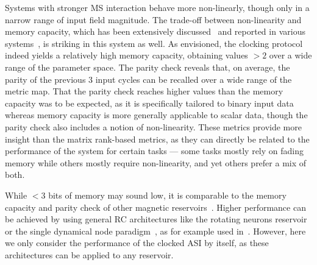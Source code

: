 Systems with stronger MS interaction behave more non-linearly, though only in a narrow range of input field magnitude.
The trade-off between non-linearity and memory capacity, which has been extensively discussed~\cite{dambre2012information,MemoryNonlinearityReservoirs,RC_BeyondMemoryNonlinearity,RC_unification} and reported in various systems~\cite{DynamicEmergence_NanomagneticSystem,RC_TaskAgnosticMetrics_v2,TaskAdaptivePRC}, is striking in this system as well.
As envisioned, the clocking protocol indeed yields a relatively high memory capacity, obtaining values $>2$ over a wide range of the parameter space.
The parity check reveals that, on average, the parity of the previous 3 input cycles can be recalled over a wide range of the metric map.
That the parity check reaches higher values than the memory capacity was to be expected, as it is specifically tailored to binary input data whereas memory capacity is more generally applicable to scalar data, though the parity check also includes a notion of non-linearity.
These metrics provide more insight than the matrix rank-based metrics, as they can directly be related to the performance of the system for certain tasks --- some tasks mostly rely on fading memory while others mostly require non-linearity, and yet others prefer a mix of both. \par
While $<3$ bits of memory may sound low, it is comparable to the memory capacity and parity check of other magnetic reservoirs~\cite{AdaptiveProgrammableRC,hon2021numerical,tsunegi2019STOforcedsyncRC,Venkat_2024,Vidamour_2022}. %
Higher performance can be achieved by using general RC architectures like the rotating neurons reservoir~\cite{RotatingNeuronsRC} or the single dynamical node paradigm~\cite{appeltant2011information}, as for example used in~.
However, here we only consider the performance of the clocked ASI by itself, as these architectures can be applied to any reservoir.

